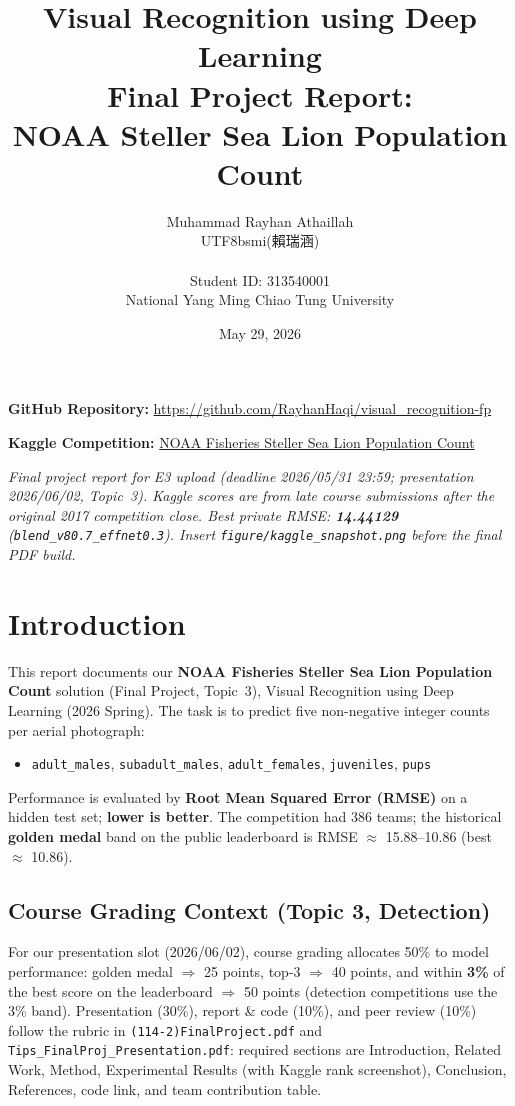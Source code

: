 \documentclass[12pt, a4paper]{article}
\title{\textbf{Visual Recognition using Deep Learning}\\ \large Final Project Report:\\ NOAA Steller Sea Lion Population Count}
\author{
    Muhammad Rayhan Athaillah \begin{CJK*}{UTF8}{bsmi}(賴瑞涵)\end{CJK*}\\
    \small Student ID: 313540001\\
    \small National Yang Ming Chiao Tung University
}
\date{May 29, 2026}
\begin{document}
\maketitle

\vspace{0.5cm}
\noindent \textbf{GitHub Repository:} \href{https://github.com/RayhanHaqi/visual\_recognition-fp}{https://github.com/RayhanHaqi/visual\_recognition-fp}

\vspace{0.3cm}
\noindent \textbf{Kaggle Competition:} \href{https://www.kaggle.com/competitions/noaa-fisheries-steller-sea-lion-population-count}{NOAA Fisheries Steller Sea Lion Population Count}

\vspace{0.3cm}
\noindent \textit{Final project report for E3 upload (deadline 2026/05/31 23:59; presentation 2026/06/02, Topic~3). Kaggle scores are from late course submissions after the original 2017 competition close. Best private RMSE: \textbf{14.44129} (\texttt{blend\_v80.7\_effnet0.3}). Insert \texttt{figure/kaggle\_snapshot.png} before the final PDF build.}

\section{Introduction}

This report documents our \textbf{NOAA Fisheries Steller Sea Lion Population Count} solution (Final Project, Topic~3), Visual Recognition using Deep Learning (2026 Spring). The task is to predict five non-negative integer counts per aerial photograph:

\begin{itemize}
    \item \texttt{adult\_males}, \texttt{subadult\_males}, \texttt{adult\_females}, \texttt{juveniles}, \texttt{pups}
\end{itemize}

Performance is evaluated by \textbf{Root Mean Squared Error (RMSE)} on a hidden test set; \textbf{lower is better}. The competition had 386 teams; the historical \textbf{golden medal} band on the public leaderboard is RMSE $\approx$ 15.88--10.86 (best $\approx$ 10.86).

\subsection{Course Grading Context (Topic 3, Detection)}
For our presentation slot (2026/06/02), course grading allocates 50\% to model performance: golden medal $\Rightarrow$ 25 points, top-3 $\Rightarrow$ 40 points, and within \textbf{3\%} of the best score on the leaderboard $\Rightarrow$ 50 points (detection competitions use the 3\% band). Presentation (30\%), report \& code (10\%), and peer review (10\%) follow the rubric in \texttt{(114-2)FinalProject.pdf} and \texttt{Tips\_FinalProj\_Presentation.pdf}: required sections are Introduction, Related Work, Method, Experimental Results (with Kaggle rank screenshot), Conclusion, References, code link, and team contribution table.
\end{document}
